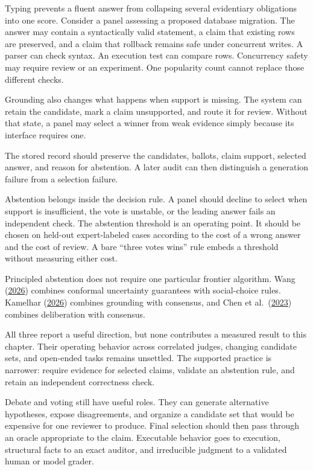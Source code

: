 Typing prevents a fluent answer from collapsing several evidentiary obligations into one score. Consider a panel assessing a proposed database migration. The answer may contain a syntactically valid statement, a claim that existing rows are preserved, and a claim that rollback remains safe under concurrent writes. A parser can check syntax. An execution test can compare rows. Concurrency safety may require review or an experiment. One popularity count cannot replace those different checks.

Grounding also changes what happens when support is missing. The system can retain the candidate, mark a claim unsupported, and route it for review. Without that state, a panel may select a winner from weak evidence simply because its interface requires one.

The stored record should preserve the candidates, ballots, claim support, selected answer, and reason for abstention. A later audit can then distinguish a generation failure from a selection failure.

Abstention belongs inside the decision rule. A panel should decline to select when support is insufficient, the vote is unstable, or the leading answer fails an independent check. The abstention threshold is an operating point. It should be chosen on held-out expert-labeled cases according to the cost of a wrong answer and the cost of review. A bare ``three votes wins'' rule embeds a threshold without measuring either cost.

Principled abstention does not require one particular frontier algorithm. Wang (\href{https://arxiv.org/abs/2604.07667}{2026}) combines conformal uncertainty guarantees with social-choice rules. Kamelhar (\href{https://arxiv.org/abs/2604.23366}{2026}) combines grounding with consensus, and Chen et al.~(\href{https://arxiv.org/abs/2309.13007}{2023}) combines deliberation with consensus.

All three report a useful direction, but none contributes a measured result to this chapter. Their operating behavior across correlated judges, changing candidate sets, and open-ended tasks remains unsettled. The supported practice is narrower: require evidence for selected claims, validate an abstention rule, and retain an independent correctness check.

Debate and voting still have useful roles. They can generate alternative hypotheses, expose disagreements, and organize a candidate set that would be expensive for one reviewer to produce. Final selection should then pass through an oracle appropriate to the claim. Executable behavior goes to execution, structural facts to an exact auditor, and irreducible judgment to a validated human or model grader.

